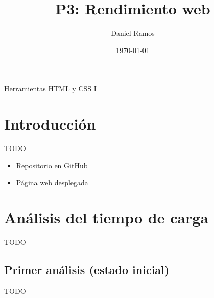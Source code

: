 \documentclass{article}
\title{P3: Rendimiento web}
\author{Daniel Ramos}
\date{\today}
\begin{document}
\maketitle

\begin{center}
    \large Herramientas HTML y CSS I
\end{center}

\newpage

\tableofcontents

\newpage

\section*{Introducción}

TODO

\begin{itemize}
    \item \href{https://github.com/DanielRamosAcosta/hhyc-dramosac}{Repositorio en GitHub}
    \item \href{https://www.danielramos.me/hhyc-dramosac}{Página web desplegada}
\end{itemize}

\newpage

\section{Análisis del tiempo de carga}\label{sec:analisis-de-tiempo-de-carga}

TODO

\subsection{Primer análisis (estado inicial)}\label{subsec:primer-analisis}

TODO
\end{document}
